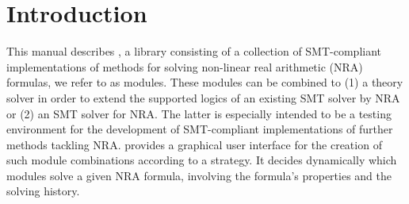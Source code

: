 \chapter{Introduction}
\label{chapter:intro}
This manual describes \smtrat, a \Cpp library consisting of a collection of
SMT-compliant implementations of methods for solving non-linear real
arithmetic (NRA) formulas, we refer to as modules. These modules can be 
combined to (1) a theory solver in order to extend the supported logics of an
existing SMT solver by NRA or (2) an SMT solver for NRA. The latter is 
especially intended to be a testing environment for the development 
of SMT-compliant implementations of further methods tackling NRA.
\smtrat provides a graphical user interface for the creation of such
module combinations according to a strategy. It decides dynamically
which modules solve a given NRA formula, involving the formula's
properties and the solving history.
